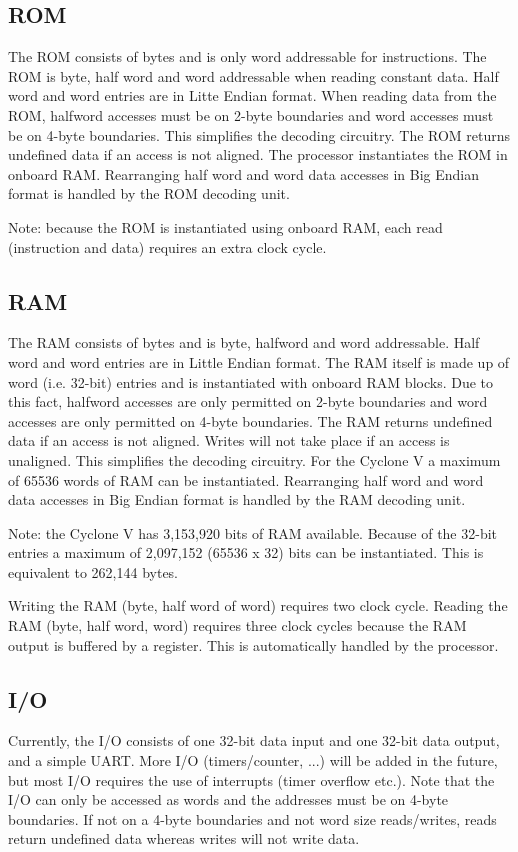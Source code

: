 \documentclass[12pt]{article}
\begin{document}
\subsection{ROM}
\label{sec:rom}
The ROM consists of bytes and is only word addressable for instructions. The ROM is byte, half word and word addressable when reading constant data. Half word and word entries are in Litte Endian format. When reading data from the ROM, halfword accesses must be on 2-byte boundaries and word accesses must be on 4-byte boundaries. This simplifies the decoding circuitry. The ROM returns undefined data if an access is not aligned. The processor instantiates the ROM in onboard RAM. Rearranging half word and word data accesses in Big Endian format is handled by the ROM decoding unit.

Note: because the ROM is instantiated using onboard RAM, each read (instruction and data) requires an extra clock cycle.

\subsection{RAM}
\label{sec:ram}
The RAM consists of bytes and is byte, halfword and word addressable. Half word and word entries are in Little Endian format. The RAM itself is made up of word (i.e. 32-bit) entries and is instantiated with onboard RAM blocks. Due to this fact, halfword accesses are only permitted on 2-byte boundaries and word accesses are only permitted on 4-byte boundaries. The RAM returns undefined data if an access is not aligned. Writes will not take place if an access is unaligned. This simplifies the decoding circuitry. For the Cyclone V a maximum of 65536 words of RAM can be instantiated. Rearranging half word and word data accesses in Big Endian format is handled by the RAM decoding unit.

Note: the Cyclone V has 3,153,920 bits of RAM available. Because of the 32-bit entries a maximum of 2,097,152 (65536 x 32) bits can be instantiated. This is equivalent to 262,144 bytes.

Writing the RAM (byte, half word of word) requires two clock cycle. Reading the RAM (byte, half word, word) requires three clock cycles because the RAM output is buffered by a register. This is automatically handled by the processor.

\subsection{I/O}
\label{sec/io}
Currently, the I/O consists of one 32-bit data input and one 32-bit data output, and a simple UART. More I/O (timers/counter, ...) will be added in the future, but most I/O requires the use of interrupts (timer overflow etc.). Note that the I/O can only be accessed as words and the addresses must be on 4-byte boundaries. If not on a 4-byte boundaries and not word size reads/writes, reads return undefined data whereas writes will not write data.
\end{document}
